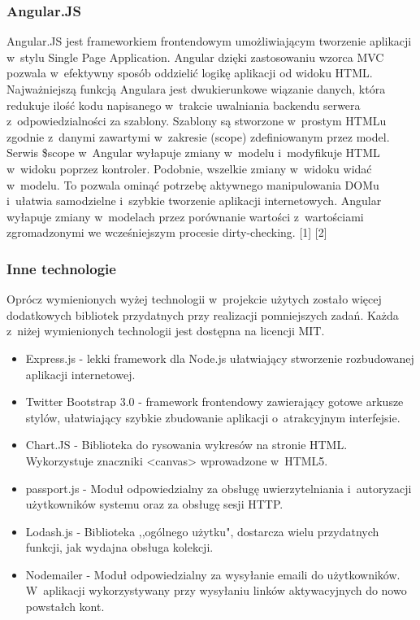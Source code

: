 \documentclass[12pt,a4paper,notitlepage]{article}
\begin{document}
\subsubsection{Angular.JS}
Angular.JS jest frameworkiem frontendowym umożliwiającym tworzenie aplikacji w~stylu Single Page Application. Angular dzięki zastosowaniu wzorca MVC pozwala w~efektywny sposób oddzielić logikę aplikacji od widoku HTML. Najważniejszą funkcją Angulara jest dwukierunkowe wiązanie danych, która redukuje ilość kodu napisanego w~trakcie uwalniania backendu serwera z~odpowiedzialności za szablony. Szablony są stworzone w~prostym HTMLu zgodnie z~danymi zawartymi w~zakresie (scope) zdefiniowanym przez model. Serwis \$scope w~Angular wyłapuje zmiany w~modelu i~modyfikuje HTML w~widoku poprzez kontroler. Podobnie, wszelkie zmiany w~widoku widać w~modelu. To pozwala ominąć potrzebę aktywnego manipulowania DOMu i~ułatwia samodzielne i~szybkie tworzenie aplikacji internetowych. Angular wyłapuje zmiany w~modelach przez porównanie wartości z~wartościami zgromadzonymi we wcześniejszym procesie dirty-checking. [1] [2]
\newpage
\subsubsection{Inne technologie}
Oprócz wymienionych wyżej technologii w~projekcie użytych zostało więcej dodatkowych bibliotek przydatnych przy realizacji pomniejszych zadań. Każda z~niżej wymienionych technologii jest dostępna na licencji MIT.

\begin{itemize}
\item Express.js - lekki framework dla Node.js ułatwiający stworzenie rozbudowanej aplikacji internetowej.
\item Twitter Bootstrap 3.0 - framework frontendowy zawierający gotowe arkusze stylów, ułatwiający szybkie zbudowanie aplikacji o~atrakcyjnym interfejsie.
\item Chart.JS - Biblioteka do rysowania wykresów na stronie HTML. Wykorzystuje znaczniki <canvas> wprowadzone w~HTML5.
\item passport.js - Moduł odpowiedzialny za obsługę uwierzytelniania i~autoryzacji użytkowników systemu oraz za obsługę sesji HTTP.
\item Lodash.js - Biblioteka ,,ogólnego użytku", dostarcza wielu przydatnych funkcji, jak wydajna obsługa kolekcji.
\item Nodemailer - Moduł odpowiedzialny za wysyłanie emaili do użytkowników. W~aplikacji wykorzystywany przy wysyłaniu linków aktywacyjnych do nowo powstałch kont.
\end{itemize}
\end{document}
